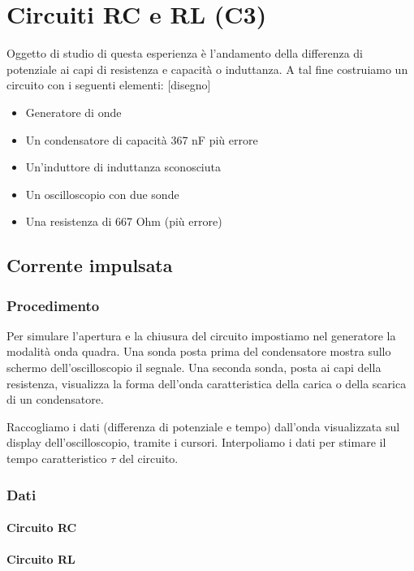 \chapter{Circuiti RC e RL (C3)}

Oggetto di studio di questa esperienza è l'andamento della differenza di potenziale ai capi di resistenza e capacità o induttanza.
A tal fine costruiamo un circuito con i seguenti elementi:
[disegno]

\begin{itemize}
  \item Generatore di onde
  \item Un condensatore di capacità 367 nF più errore
  \item Un'induttore di induttanza sconosciuta
  \item Un oscilloscopio con due sonde
  \item Una resistenza di 667 Ohm (più errore)
\end{itemize}

\section{Corrente impulsata}
\subsection{Procedimento}


Per simulare l'apertura e la chiusura del circuito impostiamo nel generatore la modalità onda quadra. Una sonda posta prima del condensatore mostra sullo schermo dell'oscilloscopio il segnale.  
Una seconda sonda, posta ai capi della resistenza, visualizza la forma dell'onda caratteristica della carica o della scarica di un condensatore.

Raccogliamo i dati (differenza di potenziale e tempo) dall'onda visualizzata sul display dell'oscilloscopio, tramite i cursori. Interpoliamo i dati per stimare il tempo caratteristico $\tau$ del circuito.

\subsection{Dati}
\subsubsection{Circuito RC}

\subsubsection{Circuito RL}


